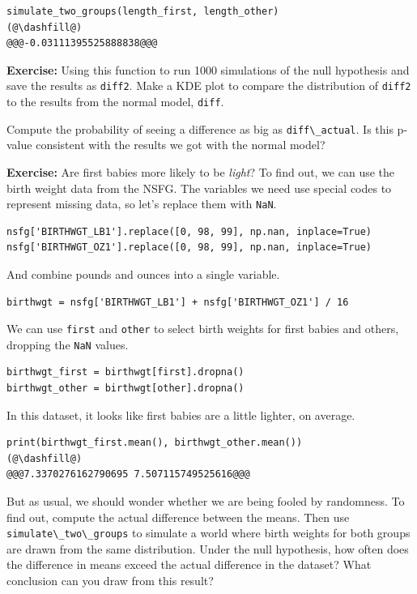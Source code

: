 \begin{lstlisting}[]
simulate_two_groups(length_first, length_other)
(@\dashfill@)
@@@-0.03111395525888838@@@
\end{lstlisting}

\textbf{Exercise:} Using this function to run 1000 simulations of the
null hypothesis and save the results as \passthrough{\lstinline!diff2!}.
Make a KDE plot to compare the distribution of
\passthrough{\lstinline!diff2!} to the results from the normal model,
\passthrough{\lstinline!diff!}.

Compute the probability of seeing a difference as big as
\passthrough{\lstinline!diff\_actual!}. Is this p-value consistent with
the results we got with the normal model?

\textbf{Exercise:} Are first babies more likely to be \emph{light}? To
find out, we can use the birth weight data from the NSFG. The variables
we need use special codes to represent missing data, so let's replace
them with \passthrough{\lstinline!NaN!}.

\begin{lstlisting}[]
nsfg['BIRTHWGT_LB1'].replace([0, 98, 99], np.nan, inplace=True)
nsfg['BIRTHWGT_OZ1'].replace([0, 98, 99], np.nan, inplace=True)
\end{lstlisting}

And combine pounds and ounces into a single variable.

\begin{lstlisting}[]
birthwgt = nsfg['BIRTHWGT_LB1'] + nsfg['BIRTHWGT_OZ1'] / 16
\end{lstlisting}

We can use \passthrough{\lstinline!first!} and
\passthrough{\lstinline!other!} to select birth weights for first babies
and others, dropping the \passthrough{\lstinline!NaN!} values.

\begin{lstlisting}[]
birthwgt_first = birthwgt[first].dropna()
birthwgt_other = birthwgt[other].dropna()
\end{lstlisting}

In this dataset, it looks like first babies are a little lighter, on
average.

\begin{lstlisting}[]
print(birthwgt_first.mean(), birthwgt_other.mean())
(@\dashfill@)
@@@7.3370276162790695 7.507115749525616@@@
\end{lstlisting}

But as usual, we should wonder whether we are being fooled by
randomness. To find out, compute the actual difference between the
means. Then use \passthrough{\lstinline!simulate\_two\_groups!} to
simulate a world where birth weights for both groups are drawn from the
same distribution. Under the null hypothesis, how often does the
difference in means exceed the actual difference in the dataset? What
conclusion can you draw from this result?

